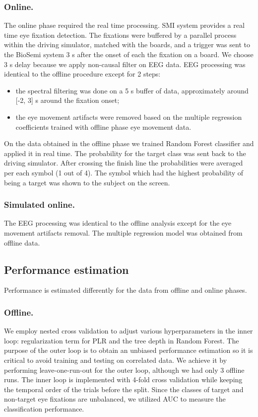 \documentclass[12pt]{iopart}
\begin{document}
\subsubsection*{Online.}
The online phase required the real time processing. SMI system provides
a real time eye fixation detection. The fixations were buffered
by a parallel process within the driving simulator, matched with the boards,
and a trigger was sent to the BioSemi system 3 s after the onset of each the fixation
on a board. We choose 3 s delay because we apply non-causal filter on EEG data.
EEG processing  was identical to the offline procedure
except for 2 steps:
\begin{itemize}
    \item the spectral filtering was done on a 5 s buffer of data,
        approximately around [-2, 3] s around the fixation onset;
    \item the eye movement artifacts were removed based on the multiple
        regression coefficients trained with offline phase eye movement data.
\end{itemize}
On the data obtained in the offline phase we trained Random Forest classifier
and applied it in real time. The probability for the target class was sent
back to the driving simulator. After crossing the finish line
the probabilities were averaged per each symbol (1 out of 4).
The symbol which had the highest probability of being a target was
shown to the subject on the screen.

\subsubsection*{Simulated online.}
The EEG processing was identical to the offline analysis
except for the eye movement artifacts removal. The multiple regression
model was obtained from offline data.

\subsection{Performance estimation}

Performance is estimated differently for the data from offline and online
phases.
\subsubsection*{Offline.}
We employ nested cross validation to adjust various hyperparameters in the inner loop:
regularization term for PLR and the tree depth in Random Forest.
The purpose of the outer loop is to obtain an unbiased performance estimation
so it is critical to avoid training and testing on correlated data.
We achieve it by performing leave-one-run-out for the outer loop,
although we had only 3 offline runs.
The inner loop is implemented with 4-fold cross validation while keeping
the temporal order of the trials before the split.
Since the classes of target and non-target eye fixations are unbalanced,
we utilized AUC to measure the classification performance.
\end{document}
